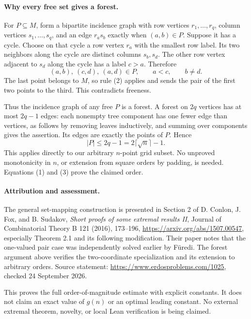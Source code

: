 \paragraph{Why every free set gives a forest.}
For \(P\subseteq M\), form a bipartite incidence graph with row vertices \(r_1,\ldots,r_q\), column vertices \(s_1,\ldots,s_q\), and an edge \(r_as_b\) exactly when \((a,b)\in P\).
Suppose it has a cycle. Choose on that cycle a row vertex \(r_a\) with the smallest row label. Its two neighbors along the cycle are distinct columns \(s_b,s_d\). The other row vertex adjacent to \(s_d\) along the cycle has a label \(c>a\). Therefore
\[
 (a,b),\ (c,d),\ (a,d)\in P,
 \qquad a<c,\qquad b\ne d.
\]
The last point belongs to \(M\), so rule (2) applies and sends the pair of the first two points to the third. This contradicts freeness.

Thus the incidence graph of any free \(P\) is a forest. A forest on \(2q\) vertices has at most \(2q-1\) edges: each nonempty tree component has one fewer edge than vertices, as follows by removing leaves inductively, and summing over components gives the assertion. Its edges are exactly the points of \(P\). Hence
\[
 |P|\leq2q-1=2\lceil\sqrt n\rceil-1. \tag{3}
\]
This applies directly to our arbitrary \(n\)-point grid subset. No unproved monotonicity in \(n\), or extension from square orders by padding, is needed. Equations (1) and (3) prove the claimed order.

\paragraph{Attribution and assessment.}
The general set-mapping construction is presented in Section 2 of D. Conlon, J. Fox, and B. Sudakov, \emph{Short proofs of some extremal results II}, Journal of Combinatorial Theory B 121 (2016), 173--196, \url{https://arxiv.org/abs/1507.00547}, especially Theorem 2.1 and its following modification. Their paper notes that the one-valued pair case was independently solved earlier by F\"uredi. The forest argument above verifies the two-coordinate specialization and its extension to arbitrary orders. Source statement: \url{https://www.erdosproblems.com/1025}, checked 24 September 2026.

This proves the full order-of-magnitude estimate with explicit constants. It does not claim an exact value of \(g(n)\) or an optimal leading constant. No external extremal theorem, novelty, or local Lean verification is being claimed.
